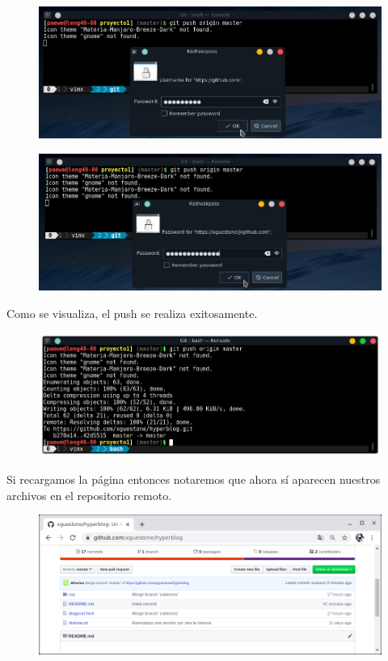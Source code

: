 \documentclass{article}
\begin{document}
\begin{figure}[h!]
  \centering
  \includegraphics[scale=0.75]{./Pictures/197_username.png}
\end{figure}

\newpage

\begin{figure}[h!]
  \centering
  \includegraphics[scale=0.75]{./Pictures/198_password.png}
\end{figure}

Como se visualiza, el push se realiza exitosamente.

\begin{figure}[h!]
  \centering
  \includegraphics[scale=0.75]{./Pictures/199_push_ok.png}
\end{figure}

Si recargamos la página entonces notaremos que ahora sí aparecen nuestros
archivos en el repositorio remoto.

\begin{figure}[h!]
  \centering
  \includegraphics[scale=0.75]{./Pictures/200_github_update.png}
\end{figure}
\end{document}
